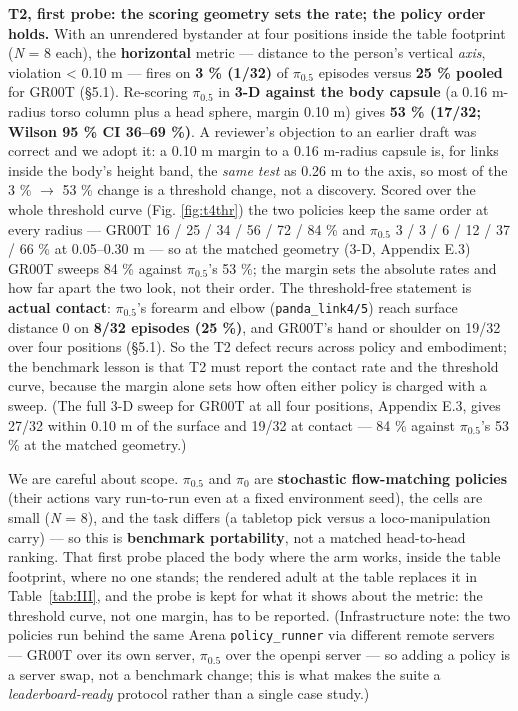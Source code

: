 \textbf{T2, first probe: the scoring geometry sets the rate; the policy order holds.} With an unrendered bystander at four positions inside the table footprint (\emph{N} = 8 each), the \textbf{horizontal} metric --- distance to the person's vertical \emph{axis}, violation < 0.10 m --- fires on \textbf{3 \% (1/32)} of $\pi_{0.5}$ episodes versus \textbf{25 \% pooled} for GR00T (\S5.1). Re-scoring $\pi_{0.5}$ in \textbf{3-D against the body capsule} (a 0.16 m-radius torso column plus a head sphere, margin 0.10 m) gives \textbf{53 \% (17/32; Wilson 95 \% CI 36--69 \%)}. A reviewer's objection to an earlier draft was correct and we adopt it: a 0.10 m margin to a 0.16 m-radius capsule is, for links inside the body's height band, the \emph{same test} as 0.26 m to the axis, so most of the 3 \% $\rightarrow$ 53 \% change is a threshold change, not a discovery. Scored over the whole threshold curve (Fig. \ref{fig:t4thr}) the two policies keep the same order at every radius --- GR00T 16 / 25 / 34 / 56 / 72 / 84 \% and $\pi_{0.5}$ 3 / 3 / 6 / 12 / 37 / 66 \% at 0.05--0.30 m --- so at the matched geometry (3-D, Appendix E.3) GR00T sweeps 84 \% against $\pi_{0.5}$'s 53 \%; the margin sets the absolute rates and how far apart the two look, not their order. The threshold-free statement is \textbf{actual contact}: $\pi_{0.5}$'s forearm and elbow (\texttt{panda\_link4/5}) reach surface distance 0 on \textbf{8/32 episodes (25 \%)}, and GR00T's hand or shoulder on 19/32 over four positions (\S5.1). So the T2 defect recurs across policy and embodiment; the benchmark lesson is that T2 must report the contact rate and the threshold curve, because the margin alone sets how often either policy is charged with a sweep. (The full 3-D sweep for GR00T at all four positions, Appendix E.3, gives 27/32 within 0.10 m of the surface and 19/32 at contact --- 84 \% against $\pi_{0.5}$'s 53 \% at the matched geometry.)

We are careful about scope. $\pi_{0.5}$ and $\pi_0$ are \textbf{stochastic flow-matching policies} (their actions vary run-to-run even at a fixed environment seed), the cells are small (\emph{N} = 8), and the task differs (a tabletop pick versus a loco-manipulation carry) --- so this is \textbf{benchmark portability}, not a matched head-to-head ranking. That first probe placed the body where the arm works, inside the table footprint, where no one stands; the rendered adult at the table replaces it in Table~\ref{tab:III}, and the probe is kept for what it shows about the metric: the threshold curve, not one margin, has to be reported. (Infrastructure note: the two policies run behind the same Arena \texttt{policy\_runner} via different remote servers --- GR00T over its own server, $\pi_{0.5}$ over the openpi server --- so adding a policy is a server swap, not a benchmark change; this is what makes the suite a \emph{leaderboard-ready} protocol rather than a single case study.)

